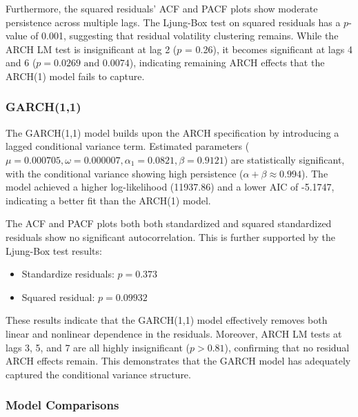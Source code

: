 \documentclass[12pt]{article}
\begin{document}
Furthermore, the squared residuals’ ACF and PACF plots show moderate persistence across multiple lags. The Ljung-Box test on squared residuals has a $p$-value of 0.001, suggesting that residual volatility clustering remains. While the ARCH LM test is insignificant at lag 2 ($p$ = 0.26), it becomes significant at lags 4 and 6 ($p = 0.0269 \text{ and } 0.0074$), indicating remaining ARCH effects that the ARCH(1) model fails to capture.

\subsubsection*{GARCH(1,1)}

The GARCH(1,1) model builds upon the ARCH specification by introducing a lagged conditional variance term. Estimated parameters ($\mu = 0.000705, \omega = 0.000007, \alpha_1 = 0.0821, \beta = 0.9121$) are statistically significant, with the conditional variance showing high persistence ($\alpha + \beta \approx 0.994$). The model achieved a higher log-likelihood (11937.86) and a lower AIC of -5.1747, indicating a better fit than the ARCH(1) model.

The ACF and PACF plots both both standardized and squared standardized residuals show no significant autocorrelation. This is further supported by the Ljung-Box test results:

\begin{itemize}
	\item Standardize residuals: $p=0.373$
	\item Squared residual: $p=0.09932$
\end{itemize}

These results indicate that the GARCH(1,1) model effectively removes both linear and nonlinear dependence in the residuals. Moreover, ARCH LM tests at lags 3, 5, and 7 are all highly insignificant ($p > 0.81$), confirming that no residual ARCH effects remain. This demonstrates that the GARCH model has adequately captured the conditional variance structure.

\subsubsection*{Model Comparisons}
\end{document}
